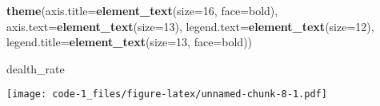 \documentclass[
]{article}
\newenvironment{Shaded}{\begin{snugshade}}{\end{snugshade}}
\newcommand{\AttributeTok}[1]{\textcolor[rgb]{0.13,0.29,0.53}{#1}}
\newcommand{\DecValTok}[1]{\textcolor[rgb]{0.00,0.00,0.81}{#1}}
\newcommand{\FunctionTok}[1]{\textcolor[rgb]{0.13,0.29,0.53}{\textbf{#1}}}
\newcommand{\NormalTok}[1]{#1}
\newcommand{\StringTok}[1]{\textcolor[rgb]{0.31,0.60,0.02}{#1}}
\begin{document}
\begin{Shaded}
\begin{Highlighting}[]
  \FunctionTok{theme}\NormalTok{(}\AttributeTok{axis.title=}\FunctionTok{element\_text}\NormalTok{(}\AttributeTok{size=}\DecValTok{16}\NormalTok{, }\AttributeTok{face=}\StringTok{\textquotesingle{}bold\textquotesingle{}}\NormalTok{), }\AttributeTok{axis.text=}\FunctionTok{element\_text}\NormalTok{(}\AttributeTok{size=}\DecValTok{13}\NormalTok{),}
        \AttributeTok{legend.text=}\FunctionTok{element\_text}\NormalTok{(}\AttributeTok{size=}\DecValTok{12}\NormalTok{), }\AttributeTok{legend.title=}\FunctionTok{element\_text}\NormalTok{(}\AttributeTok{size=}\DecValTok{13}\NormalTok{, }\AttributeTok{face=}\StringTok{\textquotesingle{}bold\textquotesingle{}}\NormalTok{))}

\NormalTok{dealth\_rate}
\end{Highlighting}
\end{Shaded}

\texttt{[image: code-1\_files/figure-latex/unnamed-chunk-8-1.pdf]}
\end{document}

